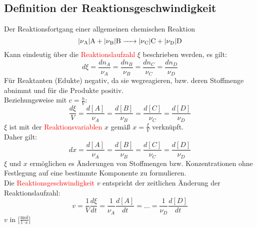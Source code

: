 \documentclass[a4paper, fleqn]{article}
\begin{document}
\subsection{Definition der Reaktionsgeschwindigkeit}
Der Reaktionsfortgang einer allgemeinen chemischen Reaktion\\
\begin{equation*}
    \ce{\lvert\nu_A\rvert A + \lvert\nu_B\rvert B -> \lvert\nu_C\rvert C +\lvert\nu_D\rvert D}
\end{equation*}
Kann eindeutig über die \textcolor{red}{Reaktionslaufzahl} $\xi$ beschrieben werden, es gilt:
\begin{equation*}
    d\xi = \frac{dn_A}{\nu_A} = \frac{dn_B}{\nu_B} = \frac{dn_C}{\nu_C} = \frac{dn_D}{\nu_D}
\end{equation*}
Für Reaktanten (Edukte) negativ, da sie wegreagieren, bzw. deren Stoffmenge abnimmt und für die Produkte positiv.\\
Beziehungsweise mit $c=\frac{n}{V}$:
\begin{equation*}
    \frac{d\xi}{V} = \frac{d[A]}{\nu_A} =\frac{d[B]}{\nu_B}=\frac{d[C]}{\nu_C}=\frac{d[D]}{\nu_D}
\end{equation*}
$\xi$ ist mit der \textcolor{red}{Reaktionsvariablen} $x$ gemäß $x=\frac{\xi}{V}$ verknüpft.\\
Daher gilt:
\begin{equation*}
    dx = \frac{d[A]}{\nu_A}=\frac{d[B]}{\nu_B}=\frac{d[C]}{\nu_C}=\frac{d[D]}{\nu_D}
\end{equation*}
$\xi$ und $x$ ermöglichen es Änderungen von Stoffmengen bzw. Konzentrationen ohne Festlegung auf eine bestimmte Komponente zu formulieren.\\
Die \textcolor{red}{Reaktionsgeschwindigkeit} $v$ entspricht der zeitlichen Änderung der Reaktionslaufzahl:
\begin{equation*}
    v = \frac{1}{V} \frac{d\xi}{dt} = \frac{1}{\nu_A} \frac{d[A]}{dt} = \dots = \frac{1}{\nu_D} \frac{d[D]}{dt}
\end{equation*}
$v$ in [$\mathrm{\frac{mol}{l\cdot s}}$]
\end{document}
